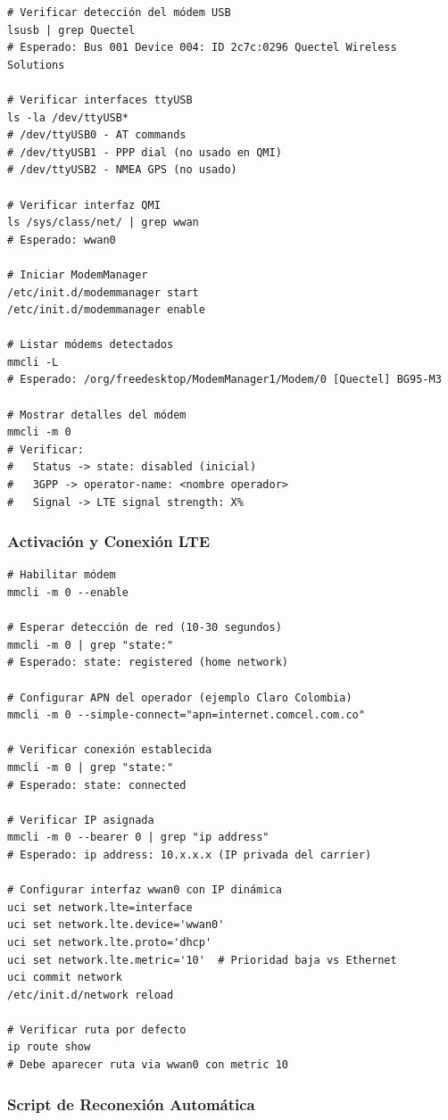 \begin{verbatim}
# Verificar detección del módem USB
lsusb | grep Quectel
# Esperado: Bus 001 Device 004: ID 2c7c:0296 Quectel Wireless Solutions

# Verificar interfaces ttyUSB
ls -la /dev/ttyUSB*
# /dev/ttyUSB0 - AT commands
# /dev/ttyUSB1 - PPP dial (no usado en QMI)
# /dev/ttyUSB2 - NMEA GPS (no usado)

# Verificar interfaz QMI
ls /sys/class/net/ | grep wwan
# Esperado: wwan0

# Iniciar ModemManager
/etc/init.d/modemmanager start
/etc/init.d/modemmanager enable

# Listar módems detectados
mmcli -L
# Esperado: /org/freedesktop/ModemManager1/Modem/0 [Quectel] BG95-M3

# Mostrar detalles del módem
mmcli -m 0
# Verificar:
#   Status -> state: disabled (inicial)
#   3GPP -> operator-name: <nombre operador>
#   Signal -> LTE signal strength: X%
\end{verbatim}

\subsubsection{Activación y Conexión LTE}

\begin{verbatim}
# Habilitar módem
mmcli -m 0 --enable

# Esperar detección de red (10-30 segundos)
mmcli -m 0 | grep "state:"
# Esperado: state: registered (home network)

# Configurar APN del operador (ejemplo Claro Colombia)
mmcli -m 0 --simple-connect="apn=internet.comcel.com.co"

# Verificar conexión establecida
mmcli -m 0 | grep "state:"
# Esperado: state: connected

# Verificar IP asignada
mmcli -m 0 --bearer 0 | grep "ip address"
# Esperado: ip address: 10.x.x.x (IP privada del carrier)

# Configurar interfaz wwan0 con IP dinámica
uci set network.lte=interface
uci set network.lte.device='wwan0'
uci set network.lte.proto='dhcp'
uci set network.lte.metric='10'  # Prioridad baja vs Ethernet
uci commit network
/etc/init.d/network reload

# Verificar ruta por defecto
ip route show
# Debe aparecer ruta via wwan0 con metric 10
\end{verbatim}

\subsubsection{Script de Reconexión Automática}

